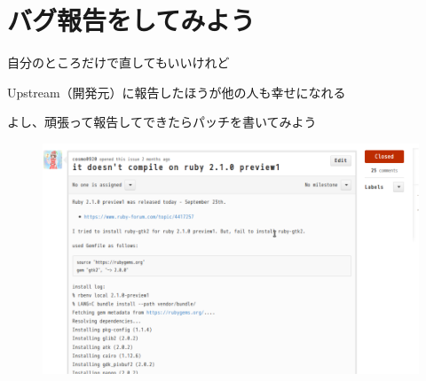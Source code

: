 \section{バグ報告をしてみよう}
\begin{frame}
\begin{itemize}
{\huge
\item 自分のところだけで直してもいいけれど
\item Upstream（開発元）に報告したほうが他の人も幸せになれる
\item よし、頑張って報告してできたらパッチを書いてみよう
}
\end{itemize}
\end{frame}

\begin{frame}
\begin{figure}
  \includegraphics[width=12cm]{img/issue180.png}
\end{figure}
\end{frame}
